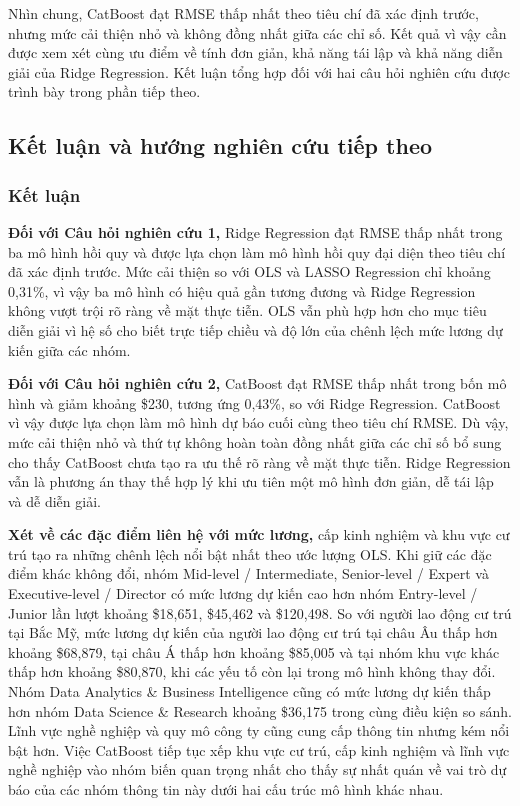 Nhìn chung, CatBoost đạt RMSE thấp nhất theo tiêu chí đã xác định trước,
nhưng mức cải thiện nhỏ và không đồng nhất giữa các chỉ số. Kết quả vì
vậy cần được xem xét cùng ưu điểm về tính đơn giản, khả năng tái lập và
khả năng diễn giải của Ridge Regression. Kết luận tổng hợp đối với hai
câu hỏi nghiên cứu được trình bày trong phần tiếp theo.

\subsection{Kết luận và hướng nghiên cứu tiếp
theo}\label{nghi:kux1ebft-luux1eadn-vuxe0-hux1b0ux1edbng-nghiuxean-cux1ee9u-tiux1ebfp-theo}

\subsubsection{Kết luận}\label{nghi:kux1ebft-luux1eadn}

\textbf{Đối với Câu hỏi nghiên cứu 1,} Ridge Regression đạt RMSE thấp
nhất trong ba mô hình hồi quy và được lựa chọn làm mô hình hồi quy đại
diện theo tiêu chí đã xác định trước. Mức cải thiện so với OLS và LASSO
Regression chỉ khoảng 0,31\%, vì vậy ba mô hình có hiệu quả gần tương
đương và Ridge Regression không vượt trội rõ ràng về mặt thực tiễn. OLS
vẫn phù hợp hơn cho mục tiêu diễn giải vì hệ số cho biết trực tiếp chiều
và độ lớn của chênh lệch mức lương dự kiến giữa các nhóm.

\textbf{Đối với Câu hỏi nghiên cứu 2,} CatBoost đạt RMSE thấp nhất trong
bốn mô hình và giảm khoảng \$230, tương ứng 0,43\%, so với Ridge
Regression. CatBoost vì vậy được lựa chọn làm mô hình dự báo cuối cùng
theo tiêu chí RMSE. Dù vậy, mức cải thiện nhỏ và thứ tự không hoàn toàn
đồng nhất giữa các chỉ số bổ sung cho thấy CatBoost chưa tạo ra ưu thế
rõ ràng về mặt thực tiễn. Ridge Regression vẫn là phương án thay thế hợp
lý khi ưu tiên một mô hình đơn giản, dễ tái lập và dễ diễn giải.

\textbf{Xét về các đặc điểm liên hệ với mức lương,} cấp kinh nghiệm và
khu vực cư trú tạo ra những chênh lệch nổi bật nhất theo ước lượng OLS.
Khi giữ các đặc điểm khác không đổi, nhóm Mid-level / Intermediate,
Senior-level / Expert và Executive-level / Director có mức lương dự kiến
cao hơn nhóm Entry-level / Junior lần lượt khoảng \$18,651, \$45,462 và
\$120,498. So với người lao động cư trú tại Bắc Mỹ, mức lương dự kiến
của người lao động cư trú tại châu Âu thấp hơn khoảng \$68,879, tại châu
Á thấp hơn khoảng \$85,005 và tại nhóm khu vực khác thấp hơn khoảng
\$80,870, khi các yếu tố còn lại trong mô hình không thay đổi. Nhóm Data
Analytics \& Business Intelligence cũng có mức lương dự kiến thấp hơn
nhóm Data Science \& Research khoảng \$36,175 trong cùng điều kiện so
sánh. Lĩnh vực nghề nghiệp và quy mô công ty cũng cung cấp thông tin
nhưng kém nổi bật hơn. Việc CatBoost tiếp tục xếp khu vực cư trú, cấp
kinh nghiệm và lĩnh vực nghề nghiệp vào nhóm biến quan trọng nhất cho
thấy sự nhất quán về vai trò dự báo của các nhóm thông tin này dưới hai
cấu trúc mô hình khác nhau.

